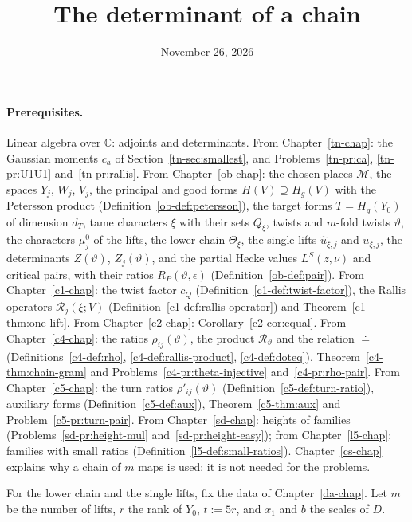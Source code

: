 \documentclass[reqno]{amsart}
\title{The determinant of a chain}
\author{}
\date{November 26, 2026}
\newcounter{chap}
\theoremstyle{definition}
\theoremstyle{plain}
\newcommand{\C}{\mathbb C}
\newcommand{\Rc}{\mathcal R}
\begin{document}
\maketitle
{}\label{chap}

\paragraph{Prerequisites.}
Linear algebra over \(\C\): adjoints and determinants.  From Chapter~\ref{tn-chap}: the Gaussian moments \(c_a\) of Section~\ref{tn-sec:smallest}, and Problems~\ref{tn-pr:ca}, \ref{tn-pr:U1U1} and~\ref{tn-pr:rallis}.  From Chapter~\ref{ob-chap}: the chosen places \(\mathcal M\), the spaces \(Y_j\), \(W_j\), \(V_j\), the principal and good forms \(H(V) \supseteq H_g(V)\) with the Petersson product (Definition~\ref{ob-def:petersson}), the target forms \(T = H_g(Y_0)\) of dimension \(d_T\), tame characters \(\xi\) with their sets \(Q_\xi\), twists and \(m\)-fold twists \(\vartheta\), the characters \(\mu_j^0\) of the lifts, the lower chain \(\Theta_\xi\), the single lifts \(\hat u_{\xi,j}\) and \(u_{\xi,j}\), the determinants \(Z(\vartheta)\), \(Z_j(\vartheta)\), and the partial Hecke values \(L^S(z,\nu)\) and critical pairs, with their ratios \(R_P(\vartheta, \epsilon)\) (Definition~\ref{ob-def:pair}).  From Chapter~\ref{c1-chap}: the twist factor \(c_Q\) (Definition~\ref{c1-def:twist-factor}), the Rallis operators \(\Rc_j(\xi; V)\) (Definition~\ref{c1-def:rallis-operator}) and Theorem~\ref{c1-thm:one-lift}.  From Chapter~\ref{c2-chap}: Corollary~\ref{c2-cor:equal}.  From Chapter~\ref{c4-chap}: the ratios \(\rho_{ij}(\vartheta)\), the product \(\Rc_\vartheta\) and the relation \(\doteq\) (Definitions~\ref{c4-def:rho}, \ref{c4-def:rallis-product}, \ref{c4-def:doteq}), Theorem~\ref{c4-thm:chain-gram} and Problems~\ref{c4-pr:theta-injective} and~\ref{c4-pr:rho-pair}.  From Chapter~\ref{c5-chap}: the turn ratios \(\rho'_{ij}(\vartheta)\) (Definition~\ref{c5-def:turn-ratio}), auxiliary forms (Definition~\ref{c5-def:aux}), Theorem~\ref{c5-thm:aux} and Problem~\ref{c5-pr:turn-pair}.  From Chapter~\ref{sd-chap}: heights of families (Problems~\ref{sd-pr:height-mul} and~\ref{sd-pr:height-easy}); from Chapter~\ref{l5-chap}: families with small ratios (Definition~\ref{l5-def:small-ratios}).  Chapter~\ref{cs-chap} explains why a chain of \(m\) maps is used; it is not needed for the problems.

\medskip
For the lower chain and the single lifts, fix the data of Chapter~\ref{da-chap}.  Let \(m\) be the number of lifts, \(r\) the rank of \(Y_0\), \(t := 5r\), and \(x_1\) and \(b\) the scales of \(D\).
\end{document}
